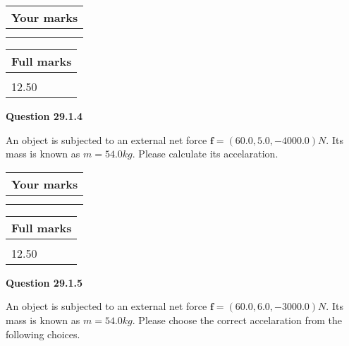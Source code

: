 \documentclass[12pt]{article}
\begin{document}
 
 

 

 
\vspace{0.3in}
  
\vspace{0.2in}
  
         \begin{tabular}{|l|}
\hline
 Your marks  \\
\hline
 \\ 
 \\ 
\hline
\end{tabular}
\hspace{0.05in} \begin{tabular}{|l|}
\hline
 Full marks  \\
\hline
 \\ 
12.50 \\
\hline
\end{tabular}
{\textbf{\Large{Question
29.1.4 
}}}
  
  
 
An object is subjected to an external net force $\mathbf{f}=(
60.0,  %
5.0,
-4000.0  )N$. Its mass is known as
$m= %
54.0 kg$. Please calculate its accelaration.
 
 

 

 
\vspace{0.3in}
  
\vspace{0.2in}
  
         \begin{tabular}{|l|}
\hline
 Your marks  \\
\hline
 \\ 
 \\ 
\hline
\end{tabular}
\hspace{0.05in} \begin{tabular}{|l|}
\hline
 Full marks  \\
\hline
 \\ 
12.50 \\
\hline
\end{tabular}
{\textbf{\Large{Question
29.1.5 
}}}
  
  
 
An object is subjected to an external net force $\mathbf{f}=(
60.0 ,
6.0,
-3000.0  )N$. Its mass is known as
$m= %
54.0  kg$. Please choose the correct accelaration
from the following choices.
 
  
  
\end{document}
